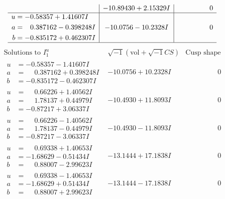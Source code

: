 \documentclass[1p]{elsarticle_modified}
\theoremstyle{definition}
\newcommand{\I}{\sqrt{-1}}
\begin{document}
$$\begin{array}{c|c|c}
 & -10.89430 + 2.15329 I & \phantom{-0.000000 } 0 \\ \hline\begin{aligned}
u &= -0.58357 + 1.41607 I \\
a &= \phantom{-}0.387162 - 0.398248 I \\
b &= -0.835172 + 0.462307 I\end{aligned}
 & -10.0756 - 10.2328 I & \phantom{-0.000000 } 0\\
 \hline 
 \end{array}$$\newpage$$\begin{array}{c|c|c}  
\text{Solutions to }I^u_{1}& \I (\text{vol} + \sqrt{-1}CS) & \text{Cusp shape}\\
 \hline 
\begin{aligned}
u &= -0.58357 - 1.41607 I \\
a &= \phantom{-}0.387162 + 0.398248 I \\
b &= -0.835172 - 0.462307 I\end{aligned}
 & -10.0756 + 10.2328 I & \phantom{-0.000000 } 0 \\ \hline\begin{aligned}
u &= \phantom{-}0.66226 + 1.40562 I \\
a &= \phantom{-}1.78137 + 0.44979 I \\
b &= -0.87217 + 3.06337 I\end{aligned}
 & -10.4930 + 11.8093 I & \phantom{-0.000000 } 0 \\ \hline\begin{aligned}
u &= \phantom{-}0.66226 - 1.40562 I \\
a &= \phantom{-}1.78137 - 0.44979 I \\
b &= -0.87217 - 3.06337 I\end{aligned}
 & -10.4930 - 11.8093 I & \phantom{-0.000000 } 0 \\ \hline\begin{aligned}
u &= \phantom{-}0.69338 + 1.40653 I \\
a &= -1.68629 - 0.51434 I \\
b &= \phantom{-}0.88007 - 2.99623 I\end{aligned}
 & -13.1444 + 17.1838 I & \phantom{-0.000000 } 0 \\ \hline\begin{aligned}
u &= \phantom{-}0.69338 - 1.40653 I \\
a &= -1.68629 + 0.51434 I \\
b &= \phantom{-}0.88007 + 2.99623 I\end{aligned}
 & -13.1444 - 17.1838 I & \phantom{-0.000000 } 0 \\ \hline\begin{aligned}

\end{aligned}
\end{array}$$
\end{document}
